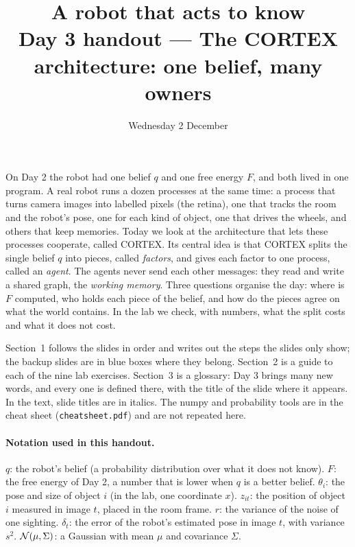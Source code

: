\documentclass[11pt]{article}
\title{\textbf{A robot that acts to know}\\[0.3em]\large Day 3 handout --- The CORTEX architecture: one belief, many owners}
\author{}
\date{Wednesday 2 December}
\begin{document}
\maketitle
\vspace{-2em}

\noindent
On Day 2 the robot had one belief $q$ and one free energy $F$, and both lived in one program. A real robot runs a dozen processes at the same time: a process that turns camera images into labelled pixels (the retina), one that tracks the room and the robot's pose, one for each kind of object, one that drives the wheels, and others that keep memories. Today we look at the architecture that lets these processes cooperate, called CORTEX. Its central idea is that CORTEX splits the single belief $q$ into pieces, called \emph{factors}, and gives each factor to one process, called an \emph{agent}. The agents never send each other messages: they read and write a shared graph, the \emph{working memory}. Three questions organise the day: where is $F$ computed, who holds each piece of the belief, and how do the pieces agree on what the world contains. In the lab we check, with numbers, what the split costs and what it does not cost.

Section~1 follows the slides in order and writes out the steps the slides only show; the backup slides are in blue boxes where they belong. Section~2 is a guide to each of the nine lab exercises. Section~3 is a glossary: Day 3 brings many new words, and every one is defined there, with the title of the slide where it appears. In the text, slide titles are in italics. The numpy and probability tools are in the cheat sheet (\texttt{cheatsheet.pdf}) and are not repeated here.

\paragraph{Notation used in this handout.}
$q$: the robot's belief (a probability distribution over what it does not know). $F$: the free energy of Day 2, a number that is lower when $q$ is a better belief. $\theta_i$: the pose and size of object $i$ (in the lab, one coordinate $x$). $z_{it}$: the position of object $i$ measured in image $t$, placed in the room frame. $r$: the variance of the noise of one sighting. $\delta_t$: the error of the robot's estimated pose in image $t$, with variance $s^2$. $\mathcal{N}(\mu,\Sigma)$: a Gaussian with mean $\mu$ and covariance $\Sigma$.

\end{document}
